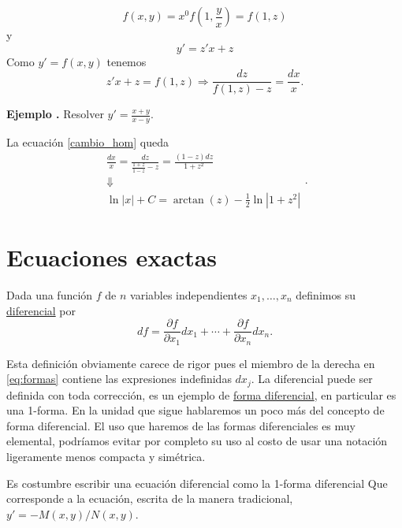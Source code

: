 \documentclass{article}
\newcounter{ejemplo_cont}
\newenvironment{ejemplo}{\noindent\textbf{Ejemplo  \arabic{ejemplo_cont}.} }{\addtocounter{ejemplo_cont}{1}}
\begin{document}
\[f(x,y)=x^0f\left(1,\frac{y}{x}\right)=f(1,z)\]
y
\[y'=z'x+z\]
Como $y'=f(x,y)$ tenemos
\begin{equation}\label{cambio_hom}z'x+z=f(1,z)\Longrightarrow \frac{dz}{f(1,z)-z}=\frac{dx}{x}.\end{equation}



\begin{ejemplo} Resolver $y'=\frac{x+y}{x-y}$. 

La ecuación \eqref{cambio_hom} queda
\[ \begin{array}{c} \frac{dx}{x}=\frac{dz}{\frac{1+z}{1-z}-z}=\frac{(1-z)dz}{1+z^2}\\
 \Downarrow\\
\ln|x|+C=\arctan(z)-\frac{1}{2}\ln|1+z^2|
    \end{array}.
\]

\end{ejemplo}



\section[Exactas]{Ecuaciones exactas}



\begin{definicion}[Diferencial]
 Dada una función $f$ de $n$ variables independientes $x_1,\ldots,x_n$ definimos su \href{http://es.wikipedia.org/wiki/Diferencial_de_una_función}{diferencial}
 por 
 \begin{equation}\label{eq:formas} df=\frac{\partial f}{\partial x_1}dx_1+\cdots +\frac{\partial f}{\partial x_n}dx_n.
   \end{equation}

 \end{definicion}
 
 Esta definición obviamente carece de rigor pues el miembro de la derecha en \eqref{eq:formas} contiene las expresiones indefinidas $dx_j$. 
La diferencial puede ser definida con toda corrección, es un ejemplo de \href{https://es.wikipedia.org/wiki/Forma_diferencial}{forma diferencial}, en particular  es una 1-forma. En la unidad que sigue hablaremos un poco más del concepto de forma diferencial. El uso que haremos de las formas diferenciales es muy elemental, podríamos evitar por completo su uso al costo de usar una notación ligeramente menos compacta y simétrica.

 Es costumbre escribir una ecuación diferencial  como la 1-forma diferencial
Que corresponde a la ecuación, escrita de la manera tradicional, $y'=-M(x,y)/N(x,y)$.
\end{document}
